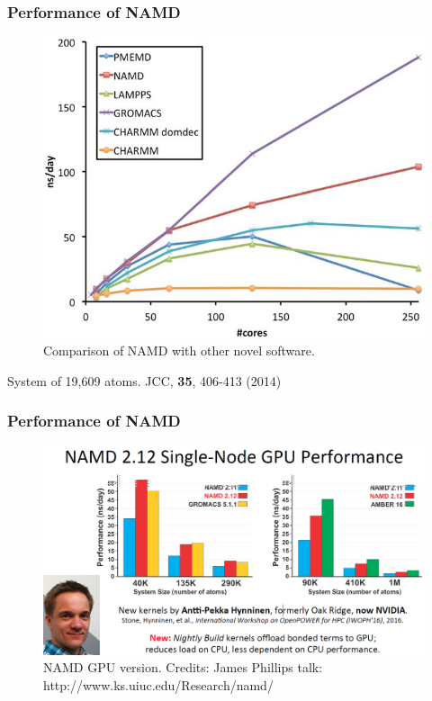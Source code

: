 \documentclass{beamer}
\begin{document}
\begin{frame}
  \frametitle{Performance of NAMD}

\begin{figure}
\includegraphics[scale=0.21]{pekka-charmm2.png}
\caption{{\scriptsize Comparison of NAMD with other novel software.}}

\end{figure}

System of 19,609 atoms. JCC, {\bf 35}, 406-413 (2014)

\end{frame}

\begin{frame}
  \frametitle{Performance of NAMD}


\begin{figure}
\includegraphics[scale=0.15]{namd_performance_gpu.png}
\caption{{\scriptsize  NAMD GPU version.  Credits: James Phillips talk: http://www.ks.uiuc.edu/Research/namd/ }}
\end{figure}


\end{frame}
\end{document}
